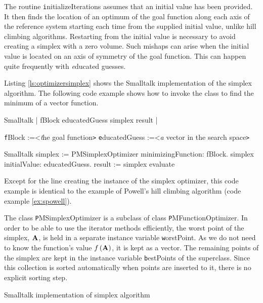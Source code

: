 The routine {\texttt initializeIterations} assumes that an initial
value has been provided. It then finds the location of an optimum
of the goal function along each axis of the reference system
starting each time from the supplied initial value, unlike hill
climbing algorithms. Restarting from the initial value is
necessary to avoid creating a simplex with a zero volume. Such
mishaps can arise when the initial value is located on an axis of
symmetry of the goal function.
This can happen quite frequently with {\textsl educated guesses}.

Listing \ref{ls:optimizersimplex} shows
the Smalltalk implementation of the simplex algorithm. The
following code example shows how to invoke the class to find the
minimum of a vector function.

\begin{displaycode}{Smalltalk}
 | fBlock educatedGuess simplex result |
\end{displaycode}
 {\texttt fBlock :=<\textsl the goal function\texttt >}\hfil\break
 {\texttt educatedGuess :=<\textsl a vector in the search space\texttt >}
\begin{displaycode}{Smalltalk}
 simplex := PMSimplexOptimizer minimizingFunction: fBlock.
 simplex initialValue: educatedGuess.
 result := simplex evaluate
\end{displaycode}
Except for the line creating the instance of the simplex
optimizer, this code example is identical to the example of
Powell's hill climbing algorithm (code example \ref{ex:spowell}).

The class {\texttt PMSimplexOptimizer} is a subclass of class {\texttt
PMFunctionOptimizer}. In order to be able to use the iterator
methods efficiently, the worst point of the simplex, ${\textbf A}$, is
held in a separate instance variable {\texttt worstPoint}. As we do
not need to know the function's value $f\left({\textbf A}\right)$, it
is kept as a vector. The remaining points of the simplex are kept
in the instance variable {\texttt bestPoints} of the superclass. Since
this collection is sorted automatically when points are inserted
to it, there is no explicit sorting step.

\begin{listing} Smalltalk implementation of simplex algorithm
\label{ls:optimizersimplex}

\end{listing}

